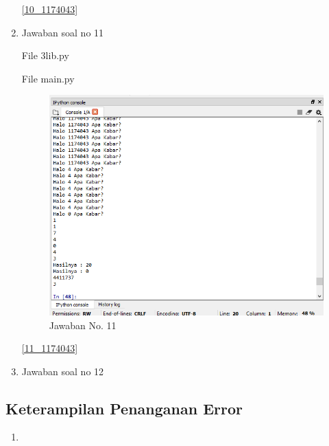 \begin{enumerate}
				\ref{10_1174043}
				
			\item Jawaban soal no 11
			
				File 3lib.py
				
				
				File main.py
				
				
				\begin{figure} [ht]
					\centerline{\includegraphics[width=1\textwidth]{figures/chapter3/11_1174043.png}}
					\caption{Jawaban No. 11}
					\label{11}
				\end{figure}

				\ref{11_1174043}
				
			\item Jawaban soal no 12
			
		
		\end{enumerate}
		
		\subsection{Keterampilan Penanganan Error}
			\begin{enumerate}
				\item 
			
			\end{enumerate}
			
		